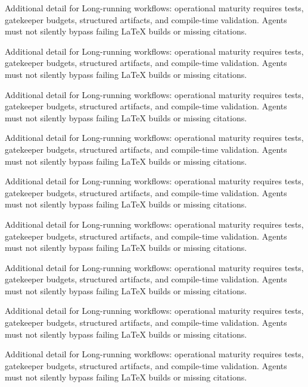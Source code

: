 Additional detail for Long-running workflows: operational maturity requires tests, gatekeeper budgets, structured artifacts, and compile-time validation. Agents must not silently bypass failing LaTeX builds or missing citations. \cite{crewai2024} \cite{langgraph2024} \cite{mcp2024}

Additional detail for Long-running workflows: operational maturity requires tests, gatekeeper budgets, structured artifacts, and compile-time validation. Agents must not silently bypass failing LaTeX builds or missing citations. \cite{crewai2024} \cite{langgraph2024} \cite{mcp2024}

Additional detail for Long-running workflows: operational maturity requires tests, gatekeeper budgets, structured artifacts, and compile-time validation. Agents must not silently bypass failing LaTeX builds or missing citations. \cite{crewai2024} \cite{langgraph2024} \cite{mcp2024}

Additional detail for Long-running workflows: operational maturity requires tests, gatekeeper budgets, structured artifacts, and compile-time validation. Agents must not silently bypass failing LaTeX builds or missing citations. \cite{crewai2024} \cite{langgraph2024} \cite{mcp2024}

Additional detail for Long-running workflows: operational maturity requires tests, gatekeeper budgets, structured artifacts, and compile-time validation. Agents must not silently bypass failing LaTeX builds or missing citations. \cite{crewai2024} \cite{langgraph2024} \cite{mcp2024}

Additional detail for Long-running workflows: operational maturity requires tests, gatekeeper budgets, structured artifacts, and compile-time validation. Agents must not silently bypass failing LaTeX builds or missing citations. \cite{crewai2024} \cite{langgraph2024} \cite{mcp2024}

Additional detail for Long-running workflows: operational maturity requires tests, gatekeeper budgets, structured artifacts, and compile-time validation. Agents must not silently bypass failing LaTeX builds or missing citations. \cite{crewai2024} \cite{langgraph2024} \cite{mcp2024}

Additional detail for Long-running workflows: operational maturity requires tests, gatekeeper budgets, structured artifacts, and compile-time validation. Agents must not silently bypass failing LaTeX builds or missing citations. \cite{crewai2024} \cite{langgraph2024} \cite{mcp2024}

Additional detail for Long-running workflows: operational maturity requires tests, gatekeeper budgets, structured artifacts, and compile-time validation. Agents must not silently bypass failing LaTeX builds or missing citations. \cite{crewai2024} \cite{langgraph2024} \cite{mcp2024}

